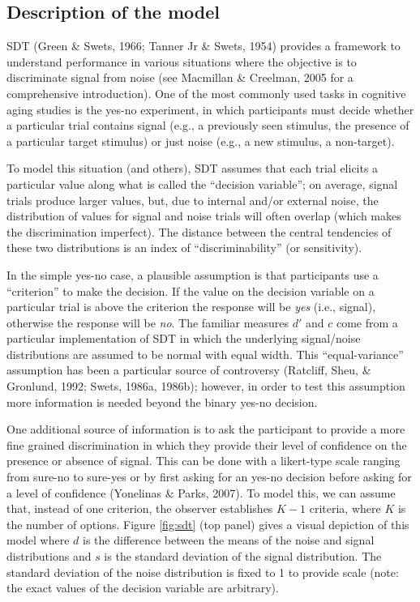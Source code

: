 \documentclass[
  english,
  ,man,floatsintext]{apa6}
\begin{document}
\hypertarget{description-of-the-model}{%
\subsection{Description of the model}\label{description-of-the-model}}

SDT (Green \& Swets, 1966; Tanner Jr \& Swets, 1954) provides a framework to understand performance in various situations where the objective is to discriminate signal from noise (see Macmillan \& Creelman, 2005 for a comprehensive introduction). One of the most commonly used tasks in cognitive aging studies is the yes-no experiment, in which participants must decide whether a particular trial contains signal (e.g., a previously seen stimulus, the presence of a particular target stimulus) or just noise (e.g., a new stimulus, a non-target).

To model this situation (and others), SDT assumes that each trial elicits a particular value along what is called the \enquote{decision variable}; on average, signal trials produce larger values, but, due to internal and/or external noise, the distribution of values for signal and noise trials will often overlap (which makes the discrimination imperfect). The distance between the central tendencies of these two distributions is an index of \enquote{discriminability} (or sensitivity).

In the simple yes-no case, a plausible assumption is that participants use a \enquote{criterion} to make the decision. If the value on the decision variable on a particular trial is above the criterion the response will be \emph{yes} (i.e., signal), otherwise the response will be \emph{no}. The familiar measures \(d'\) and \(c\) come from a particular implementation of SDT in which the underlying signal/noise distributions are assumed to be normal with equal width. This \enquote{equal-variance} assumption has been a particular source of controversy (Ratcliff, Sheu, \& Gronlund, 1992; Swets, 1986a, 1986b); however, in order to test this assumption more information is needed beyond the binary yes-no decision.

One additional source of information is to ask the participant to provide a more fine grained discrimination in which they provide their level of confidence on the presence or absence of signal. This can be done with a likert-type scale ranging from sure-no to sure-yes or by first asking for an yes-no decision before asking for a level of confidence (Yonelinas \& Parks, 2007). To model this, we can assume that, instead of one criterion, the observer establishes \(K - 1\) criteria, where \(K\) is the number of options. Figure \ref{fig:sdt} (top panel) gives a visual depiction of this model where \(d\) is the difference between the means of the noise and signal distributions and \(s\) is the standard deviation of the signal distribution. The standard deviation of the noise distribution is fixed to 1 to provide scale (note: the exact values of the decision variable are arbitrary).
\end{document}
